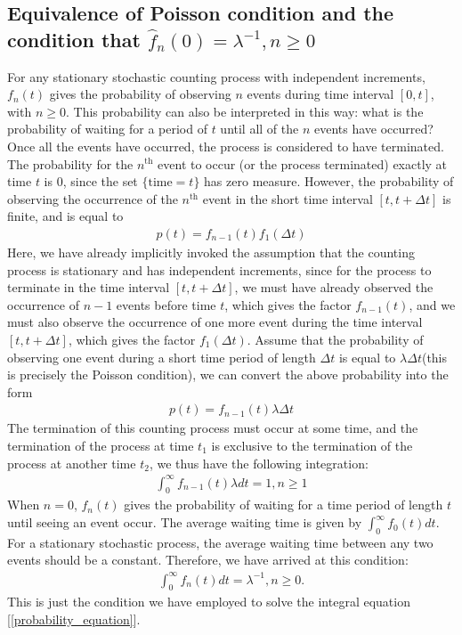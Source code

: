 \documentclass[10pt]{article}
\numberwithin{figure}{section}
\numberwithin{equation}{section}
\begin{document}
\subsection{Equivalence of Poisson condition and the condition that $\hat{f}_{n}(0) = \lambda^{-1}, n \ge 0$}
For any stationary stochastic counting process with independent increments, $f_{n}(t)$ gives the probability of observing $n$ events during time interval $[0, t]$, with $n \ge 0$. This probability can also be interpreted in this way: what is the probability of waiting for a period of $t$ until all of the $n$ events have occurred? Once all the events have occurred, the process is considered to have terminated. The probability for the $n^{\text{th}}$ event to occur (or the process terminated) exactly at time $t$ is 0, since the set $\{ \text{time} = t\}$ has zero measure. However, the probability of observing the occurrence of the $n^{\text{th}}$ event in the short time interval $[t, t + \Delta t]$ is finite, and is equal to 
\begin{eqnarray}
p(t) = f_{n-1}(t)f_{1}(\Delta t)
\end{eqnarray}
Here, we have already implicitly invoked the assumption that the counting process is stationary and has independent increments, since for the process to terminate in the time interval $[t, t + \Delta t]$, we must have already observed the occurrence of $n - 1$ events before time $t$, which gives the factor $f_{n-1}(t)$, and we must also observe the occurrence of one more event during the time interval $[t, t + \Delta t]$, which gives the factor $f_{1}(\Delta t)$. Assume that the probability of observing one event during a short time period of length $\Delta t$ is equal to $\lambda \Delta t$(this is precisely the Poisson condition), we can convert the above probability into the form
\begin{eqnarray}
p(t) = f_{n - 1}(t) \lambda \Delta t
\end{eqnarray}
The termination of this counting process must occur at some time, and the termination of the process at time $t_1$ is exclusive to the termination of the process at another time $t_2$, we thus have the following integration: 
\begin{eqnarray}
\int_{0}^{\infty} f_{n - 1}(t) \lambda dt = 1, n \ge 1
\end{eqnarray}
When $n = 0$, $f_{n}(t)$ gives the probability of waiting for a time period of length $t$ until seeing an event occur. The average waiting time is given by $\int_{0}^{\infty} f_{0}(t) dt$. For a stationary stochastic process, the average waiting time between any two events should be a constant. Therefore, we have arrived at this condition: 
\begin{eqnarray}
\int_{0}^{\infty} f_{n}(t) dt = \lambda^{-1}, n \ge 0. 
\end{eqnarray}
This is just the condition we have employed to solve the integral equation [\ref{probability_equation}]. 
\end{document}
